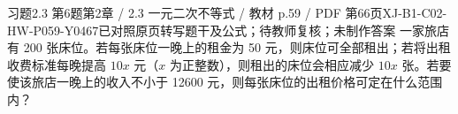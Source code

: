 \par\noindent\begin{minipage}{\linewidth}
\begin{bankitem}{习题2.3 第6题}{第2章 / 2.3 一元二次不等式 / 教材 p.59 / PDF 第66页}{XJ-B1-C02-HW-P059-Y0467}{已对照原页转写题干及公式；待教师复核；未制作答案}
一家旅店有 200 张床位。若每张床位一晚上的租金为 50 元，则床位可全部租出；若将出租收费标准每晚提高 $10x$ 元（$x$ 为正整数），则租出的床位会相应减少 $10x$ 张。若要使该旅店一晚上的收入不小于 12600 元，则每张床位的出租价格可定在什么范围内？
\end{bankitem}
\end{minipage}\par\medskip
